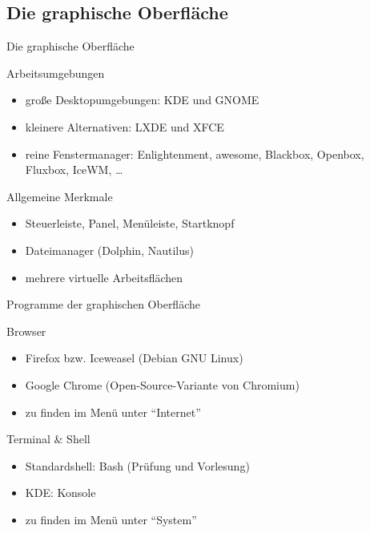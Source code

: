 \documentclass[aspectratio=43]{beamer}
\begin{document}
\subsection{Die graphische Oberfläche}
\begin{frame}{Die graphische Oberfläche}
  \begin{block}{Arbeitsumgebungen}
    \begin{itemize}
      \item große Desktopumgebungen: KDE und GNOME
      \item kleinere Alternativen: LXDE und XFCE
      \item reine Fenstermanager: Enlightenment, awesome, Blackbox, Openbox, Fluxbox, IceWM, \dots
    \end{itemize}
  \end{block}
  \begin{block}{Allgemeine Merkmale}
    \begin{itemize}
      \item Steuerleiste, Panel, Menüleiste, Startknopf
      \item Dateimanager (Dolphin, Nautilus)
      \item mehrere virtuelle Arbeitsflächen
    \end{itemize}
  \end{block}
\end{frame}

\begin{frame}{Programme der graphischen Oberfläche}
  \begin{block}{Browser}
    \begin{itemize}
      \item Firefox bzw. Iceweasel (Debian GNU Linux)
      \item Google Chrome (Open-Source-Variante von Chromium)
      \item zu finden im Menü unter "`Internet"'
    \end{itemize}
  \end{block}
  \begin{block}{Terminal \& Shell}
    \begin{itemize}
      \item Standardshell: Bash (Prüfung und Vorlesung)
      \item KDE: Konsole
      \item zu finden im Menü unter "`System"'
    \end{itemize}
  \end{block}
\end{frame}
\end{document}
